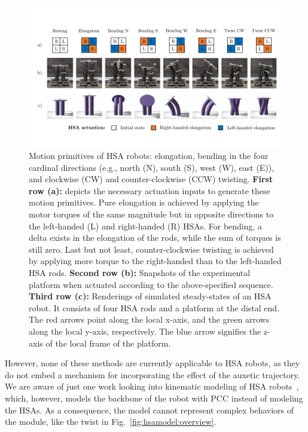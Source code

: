 \begin{figure}[hbt]
    \centering
    \includegraphics[width=1.0\textwidth]{hsamodel/figures/motion_primitives/motion_primitives_v2_compressed.pdf}
    
    \caption{Motion primitives of \gls{HSA} robots: elongation, bending in the four cardinal directions (e.g., north (N), south (S), west (W), east (E)), and clockwise (CW) and counter-clockwise (CCW) twisting.
    \textbf{First row (a):} depicts the necessary actuation inputs to generate these motion primitives. Pure elongation is achieved by applying the motor torques of the same magnitude but in opposite directions to the left-handed (L) and right-handed (R) HSAs. For bending, a delta exists in the elongation of the rods, while the sum of torques is still zero. Last but not least, counter-clockwise twisting is achieved by applying more torque to the right-handed than to the left-handed HSA rods.
    \textbf{Second row (b):} Snapshots of the experimental platform when actuated according to the above-specified sequence.
    \textbf{Third row (c):} Renderings of simulated steady-states of an HSA robot. It consists of four HSA rods and a platform at the distal end. The red arrows point along the local x-axis, and the green arrows along the local y-axis, respectively. The blue arrow signifies the z-axis of the local frame of the platform.}\label{fig:hsamodel:motion_primitives}
\end{figure}

However, none of these methods are currently applicable to HSA robots, as they do not embed a mechanism for incorporating the effect of the auxetic trajectory.
%
We are aware of just one work looking into kinematic modeling of HSA robots~\citep{garg2022kinematic}, which, however, models the backbone of the robot with \gls{PCC} instead of modeling the HSAs. As a consequence, the model cannot represent complex behaviors of the module, like the twist in Fig.~\ref{fig:hsamodel:overview}. 


